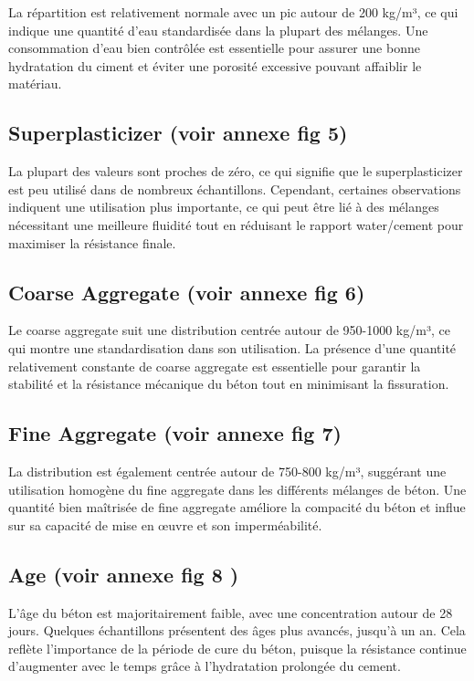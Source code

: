 \documentclass[
  12pt,
]{article}
\begin{document}
La répartition est relativement normale avec un pic autour de 200 kg/m³,
ce qui indique une quantité d'eau standardisée dans la plupart des
mélanges. Une consommation d'eau bien contrôlée est essentielle pour
assurer une bonne hydratation du ciment et éviter une porosité excessive
pouvant affaiblir le matériau.

\subsection{Superplasticizer (voir annexe fig
5)}\label{superplasticizer-voir-annexe-fig-5}

La plupart des valeurs sont proches de zéro, ce qui signifie que le
superplasticizer est peu utilisé dans de nombreux échantillons.
Cependant, certaines observations indiquent une utilisation plus
importante, ce qui peut être lié à des mélanges nécessitant une
meilleure fluidité tout en réduisant le rapport water/cement pour
maximiser la résistance finale.

\subsection{Coarse Aggregate (voir annexe fig
6)}\label{coarse-aggregate-voir-annexe-fig-6}

Le coarse aggregate suit une distribution centrée autour de 950-1000
kg/m³, ce qui montre une standardisation dans son utilisation. La
présence d'une quantité relativement constante de coarse aggregate est
essentielle pour garantir la stabilité et la résistance mécanique du
béton tout en minimisant la fissuration.

\subsection{Fine Aggregate (voir annexe fig
7)}\label{fine-aggregate-voir-annexe-fig-7}

La distribution est également centrée autour de 750-800 kg/m³, suggérant
une utilisation homogène du fine aggregate dans les différents mélanges
de béton. Une quantité bien maîtrisée de fine aggregate améliore la
compacité du béton et influe sur sa capacité de mise en œuvre et son
imperméabilité.

\subsection{Age (voir annexe fig 8 )}\label{age-voir-annexe-fig-8}

L'âge du béton est majoritairement faible, avec une concentration autour
de 28 jours. Quelques échantillons présentent des âges plus avancés,
jusqu'à un an. Cela reflète l'importance de la période de cure du béton,
puisque la résistance continue d'augmenter avec le temps grâce à
l'hydratation prolongée du cement.
\end{document}
